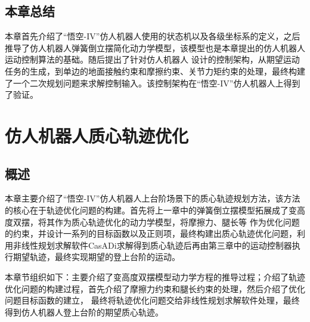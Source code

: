 \section{本章总结}
本章首先介绍了“悟空-IV”仿人机器人使用的状态机以及各级坐标系的定义，之后推导了仿人机器人弹簧倒立摆简化动力学模型，该模型也是本章提出的仿人机器人运动控制算法的基础。随后提出了针对仿人机器人
设计的控制架构，从期望运动任务的生成，到单边的地面接触约束和摩擦约束、关节力矩约束的处理，最终构建了一个二次规划问题来求解控制输入。该控制架构在“悟空-IV”仿人机器人上得到了验证。
\chapter{仿人机器人质心轨迹优化}
\section{概述}
本章主要介绍了“悟空-IV”仿人机器人上台阶场景下的质心轨迹规划方法，该方法的核心在于轨迹优化问题的构建。首先将上一章中的弹簧倒立摆模型拓展成了变高度双摆，将其作为质心轨迹优化的动力学模型，将摩擦力、腿长等
作为优化问题的约束，并设计一系列的目标函数以及正则项，最终构建出质心轨迹优化问题，利用非线性规划求解软件CasADi求解得到质心轨迹后再由第三章中的运动控制器执行期望轨迹，最终实现期望的登上台阶的运动。

本章节组织如下：主要介绍了变高度双摆模型动力学方程的推导过程；介绍了轨迹优化问题的构建过程，首先介绍了摩擦力约束和腿长约束的处理，然后介绍了优化问题目标函数的建立，
最终将轨迹优化问题交给非线性规划求解软件处理，最终得到仿人机器人登上台阶的期望质心轨迹。


